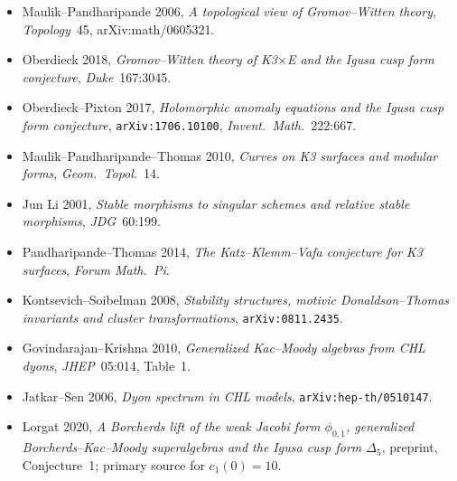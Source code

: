 \begin{itemize}
{  surfaces I--II}, \texttt{arXiv:1112.3069}.
\item Maulik--Pandharipande 2006, \emph{A topological view of
  Gromov--Witten theory}, \emph{Topology}~45, arXiv:math/0605321.
\item Oberdieck 2018, \emph{Gromov--Witten theory of K3$\times$E and
  the Igusa cusp form conjecture}, \emph{Duke}~167:3045.
\item Oberdieck--Pixton 2017, \emph{Holomorphic anomaly equations and
  the Igusa cusp form conjecture}, \texttt{arXiv:1706.10100},
  \emph{Invent.\ Math.}~222:667.
\item Maulik--Pandharipande--Thomas 2010, \emph{Curves on K3 surfaces
  and modular forms}, \emph{Geom.\ Topol.}~14.
\item Jun Li 2001, \emph{Stable morphisms to singular schemes and
  relative stable morphisms}, \emph{JDG}~60:199.
\item Pandharipande--Thomas 2014, \emph{The Katz--Klemm--Vafa
  conjecture for K3 surfaces}, \emph{Forum Math.\ Pi}.
\item Kontsevich--Soibelman 2008, \emph{Stability structures, motivic
  Donaldson--Thomas invariants and cluster transformations},
  \texttt{arXiv:0811.2435}.
\item Govindarajan--Krishna 2010, \emph{Generalized Kac--Moody
  algebras from CHL dyons}, \emph{JHEP}~05:014, Table~1.
\item Jatkar--Sen 2006, \emph{Dyon spectrum in CHL models},
  \texttt{arXiv:hep-th/0510147}.
\item Lorgat 2020, \emph{A Borcherds lift of the weak Jacobi form
  $\phi_{0,1}$, generalized Borcherds--Kac--Moody superalgebras and
  the Igusa cusp form $\Delta_5$}, preprint, Conjecture~1; primary
  source for $c_1(0) = 10$.
\end{itemize}

